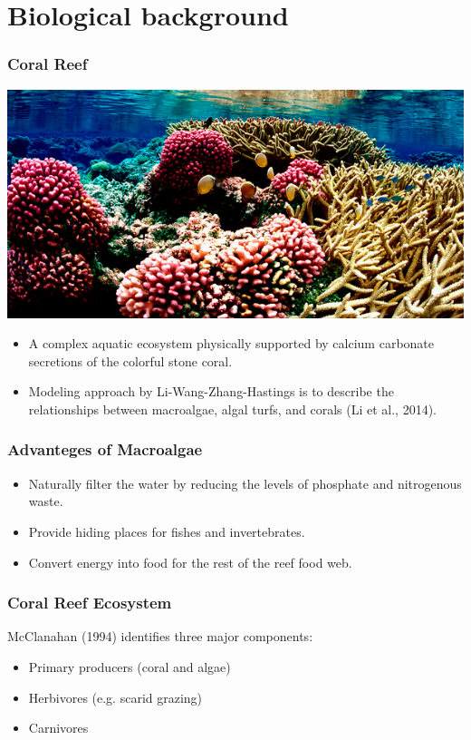 
\section{Biological background}

\begin{frame}
\frametitle{Coral Reef}
\includegraphics[scale=.175]{./US-Wildlife-coral-1.jpg}
\begin{itemize}
\item A complex aquatic ecosystem physically supported by calcium carbonate secretions of the colorful stone coral.
\item Modeling approach by Li-Wang-Zhang-Hastings is to describe the relationships between macroalgae, algal turfs, and corals (Li et al., 2014).
\end{itemize}
\end{frame}

\begin{frame}
\frametitle{Advanteges of Macroalgae}
\begin{itemize}
\item Naturally filter the water by reducing the levels of phosphate and nitrogenous waste.
\item Provide hiding places for fishes and invertebrates.
\item Convert energy into food for the rest of the reef food web.
\end{itemize}
\end{frame}

\begin{frame}
\frametitle{Coral Reef Ecosystem} 

McClanahan (1994) identifies three major components:
\begin{itemize}
\item Primary producers (coral and algae)\\
\item Herbivores (e.g. scarid grazing)\\
\item Carnivores
\end{itemize}
\end{frame}

